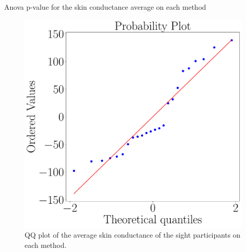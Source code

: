 \begin{table}[!htb]
    \caption{Anova p-value for the skin conductance average on each method}
    \label{tab:blocanova_gsr_two_way_blind_sight}
\begin{minipage}{0.45\textwidth}
    
\end{minipage}
\begin{minipage}{0.45\textwidth}
    
\end{minipage}
\end{table}

\begin{figure}[!htb]
    \centering
    \begin{minipage}{0.45\textwidth}
        \centering
        \includegraphics[width = \textwidth]{Resultados/GSR/Figuras/pdf/qqplot_gsr_two_way_sight.pdf}
        \caption{QQ plot of the average skin conductance of the sight participants on each method.}
        \label{fig:qqplot_gsr_two_way_sight}
    \end{minipage}
    \begin{minipage}{0.075\textwidth}
        \hfill
    \end{minipage}

\end{figure}

